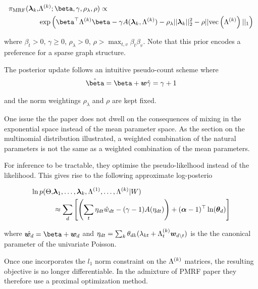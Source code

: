 \begin{align}
\begin{split}
\pi_{\text{MRF}}(\vl_k, &\blk; \vv{\beta}, \gamma, \rho_\lambda, \rho) \propto \\
& \exp\left( \vv{\beta}\T\blk\vv{\beta} - \gamma A(\vl_k, \blk) - \rho_\lambda||\vl_k||_2^2 - \rho||\vecf{\blk}||_1 \right)
\end{split}
\end{align}

where $\beta_t > 0$, $\gamma \geq 0$, $\rho_\lambda > 0$, $\rho > \max_{t,v}\beta_t\beta_v$. Note that this prior encodes a preference for a sparse graph structure.

The posterior update follows an intuitive pseudo-count scheme where
\begin{align}
\hat{\vv{\beta}} = \vv{\beta} + \vv{w}
\hat{\gamma}     = \gamma + 1
\end{align}

and the norm weightings $\rho_\lambda$ and $\rho$ are kept fixed.

One issue the the paper does not dwell on the consequences of mixing in the exponential space instead of the mean parameter space. As the section on the multinomial distribution illustrated, a weighted combination of the natural parameters is not the same as a weighted combination of the mean parameters.

For inference to be tractable, they optimise the pseudo-likelhood instead of the likelihood. This gives rise to the following approximate log-posterio

\begin{align}
\begin{split}
\ln p(\Theta, & \bm \lambda_1, \ldots, \bm \lambda_k, \Lambda^{(1)}, \ldots, \Lambda^{(k)} | W) \\
& \approx \sum_d \left[ \left( \sum_t \eta_{dt} \hat{w}_{dt} - (\gamma - 1)A(\eta_{dt}) \right) + (\bm \alpha - 1)^\top\ln({ \bm \theta_d }) \right]
\end{split}
\end{align}

where $\hat{\wdoc} = \vv{\beta} + \wdoc$ and $\eta_{dt} = \sum_k { \theta_{dk} } (\lambda_{kt} + \Lambda^{(k)}_t \bm w_{d \setminus t})$ is the the canonical parameter of the univariate Poisson.


Once one incorporates the $l_1$ norm constraint on the $\Lambda^{(k)}$ matrices, the resulting objective is no longer differentiable. In the admixture of PMRF paper they therefore use a proximal optimization method.

